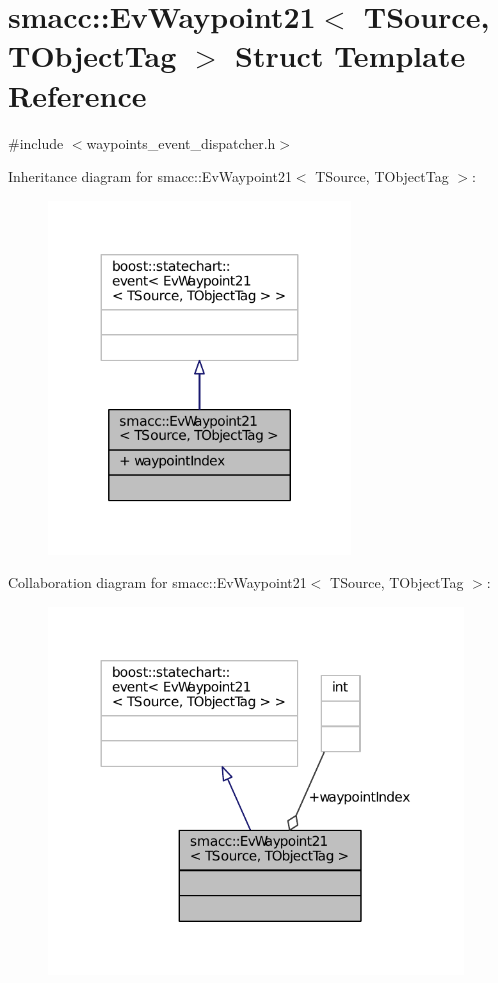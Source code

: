 \hypertarget{structsmacc_1_1EvWaypoint21}{}\section{smacc\+:\+:Ev\+Waypoint21$<$ T\+Source, T\+Object\+Tag $>$ Struct Template Reference}
\label{structsmacc_1_1EvWaypoint21}


{\ttfamily \#include $<$waypoints\+\_\+event\+\_\+dispatcher.\+h$>$}



Inheritance diagram for smacc\+:\+:Ev\+Waypoint21$<$ T\+Source, T\+Object\+Tag $>$\+:
\nopagebreak
\begin{figure}[H]
\begin{center}
\leavevmode
\includegraphics[width=227pt]{structsmacc_1_1EvWaypoint21__inherit__graph}
\end{center}
\end{figure}


Collaboration diagram for smacc\+:\+:Ev\+Waypoint21$<$ T\+Source, T\+Object\+Tag $>$\+:
\nopagebreak
\begin{figure}[H]
\begin{center}
\leavevmode
\includegraphics[width=312pt]{structsmacc_1_1EvWaypoint21__coll__graph}
\end{center}
\end{figure}
